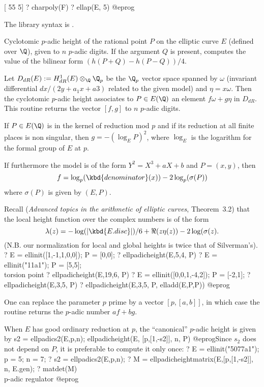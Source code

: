 [ 55  5]
? charpoly(F)
? ellap(E, 5)
@eprog

The library syntax is .

\label{se:ellpadicheight}
Cyclotomic $p$-adic height of the rational point $P$ on the elliptic curve
$E$ (defined over $\Q$), given to $n$ $p$-adic digits.
If the argument $Q$ is present, computes the value of the bilinear
form $(h(P+Q)-h(P-Q)) / 4$.

Let $D_{dR}(E) := H^1_{dR}(E) \otimes_\Q \Q_p$ be the $\Q_p$ vector space
spanned by $\omega$
(invariant differential $dx/(2y+a_1x+a3)$ related to the given model) and
$\eta = x \omega$. Then the cyclotomic $p$-adic height associates to
$P\in E(\Q)$ an element $f \omega + g\eta$ in $D_{dR}$.
This routine returns the vector $[f, g]$ to $n$ $p$-adic digits.

If $P\in E(\Q)$ is in the kernel of reduction mod $p$ and if its reduction
at all finite places is non singular, then $g = -(\log_E P)^2$, where
$\log_E$ is the logarithm for the formal group of $E$ at $p$.

If furthermore the model is of the form $Y^2 = X^3 + a X + b$ and $P = (x,y)$,
then
  $$ f = \log_p(\kbd{denominator}(x)) - 2 \log_p(\sigma(P))$$
where $\sigma(P)$ is given by $(E,P)$.

Recall (\emph{Advanced topics in the arithmetic of elliptic
curves}, Theorem~3.2) that the local height function over the complex numbers
is of the form
  $$ \lambda(z) = -\log (|\kbd{E.disc}|) / 6 + \Re(z \eta(z)) - 2 \log(
  \sigma(z). $$
(N.B. our normalization for local and global heights is twice that of
Silverman's).
\bprog
 ? E = ellinit([1,-1,1,0,0]); P = [0,0];
 ? ellpadicheight(E,5,4, P)
 ? E = ellinit("11a1"); P = [5,5]; \\ torsion point
 ? ellpadicheight(E,19,6, P)
 ? E = ellinit([0,0,1,-4,2]); P = [-2,1];
 ? ellpadicheight(E,3,5, P)
 ? ellpadicheight(E,3,5, P, elladd(E,P,P))
@eprog

One can replace the parameter $p$ prime by a vector $[p,[a,b]]$, in which
case the routine returns the $p$-adic number $af + bg$.

When $E$ has good ordinary reduction at $p$, the ``canonical''
$p$-adic height is given by
\bprog
s2 = ellpadics2(E,p,n);
ellpadicheight(E, [p,[1,-s2]], n, P)
@eprog\noindent Since $s_2$ does not depend on $P$, it is preferable to
compute it only once:
\bprog
? E = ellinit("5077a1"); p = 5; n = 7;
? s2 = ellpadics2(E,p,n);
? M = ellpadicheightmatrix(E,[p,[1,-s2]], n, E.gen);
? matdet(M)   \\ p-adic regulator
@eprog

